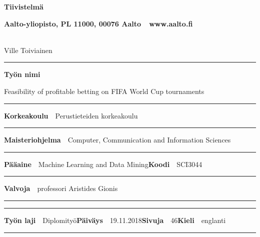 \begin{spacing}{.88}

{\parindent0pt %

{\fontsize{13.9pt}{13.9pt}\selectfont
\vspace{-8.9mm}\hfill{\bfseries\sffamily\lsstyle Tiivistelmä}}

{\fontsize{9.48pt}{9.48pt}\selectfont
\vspace{.9mm}\hfill{\bfseries\sffamily\lsstyle Aalto-yliopisto, PL 11000, 00076 Aalto~~\textcolor{aaltoGray}{www.aalto.fi}}}

\\
{\small Ville Toiviainen}

\vspace{-2.4mm}\rule{\textwidth}{.75pt}

{\fontsize{10.5pt}{10.5pt}\bfseries\sffamily\lsstyle Työn nimi}\\
\parbox[t]{\textwidth}{\raggedright\small Feasibility of profitable betting on FIFA World Cup tournaments}

\vspace{.5mm}\rule{\textwidth}{.75pt}

{\fontsize{10.5pt}{10.5pt}\bfseries\sffamily\lsstyle Korkeakoulu}~~{\small Perustieteiden korkeakoulu}

\vspace{-2.4mm}\rule{\textwidth}{.75pt}

{\fontsize{10.5pt}{10.5pt}\bfseries\sffamily\lsstyle Maisteriohjelma}~~{\small Computer, Communication and Information Sciences}

\vspace{-2.4mm}\rule{\textwidth}{.75pt}

{\fontsize{10.5pt}{10.5pt}\bfseries\sffamily\lsstyle Pääaine}~~{\small  Machine Learning and Data Mining}\hfill{\fontsize{10.5pt}{10.5pt}\bfseries\sffamily\lsstyle Koodi}~~{\small SCI3044}

\vspace{-2.4mm}\rule{\textwidth}{.75pt}

{\fontsize{10.5pt}{10.5pt}\bfseries\sffamily\lsstyle Valvoja}~~{\small professori Aristides Gionis}

\vspace{-2.4mm}\rule{\textwidth}{.75pt}

\vspace{-2.4mm}\rule{\textwidth}{.75pt}

{\fontsize{10.5pt}{10.5pt}\bfseries\sffamily\lsstyle Työn laji}~~{\small Diplomityö}\hfill{\fontsize{10.5pt}{10.5pt}\bfseries\sffamily\lsstyle Päiväys}~~{\small 19.11.2018}\hfill{\fontsize{10.5pt}{10.5pt}\bfseries\sffamily\lsstyle Sivuja}~~{\small 46}\hfill{\fontsize{10.5pt}{10.5pt}\bfseries\sffamily\lsstyle Kieli}~~{\small englanti}

\vspace{-2.4mm}\rule{\textwidth}{.75pt}

\vspace{6mm}

} %
\end{spacing}
